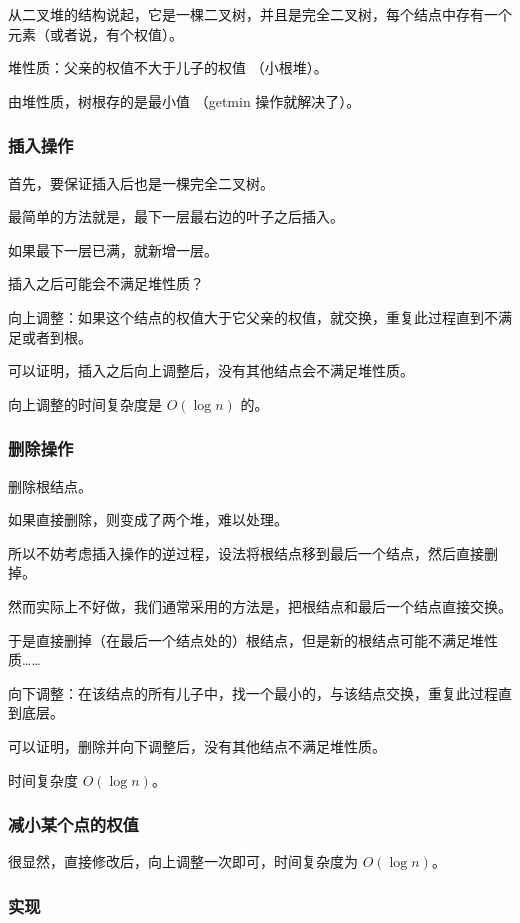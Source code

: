 从二叉堆的结构说起，它是一棵二叉树，并且是完全二叉树，每个结点中存有一个元素（或者说，有个权值）。

堆性质：父亲的权值不大于儿子的权值 （小根堆）。

由堆性质，树根存的是最小值 （getmin 操作就解决了）。

\subsubsection{插入操作}

首先，要保证插入后也是一棵完全二叉树。

最简单的方法就是，最下一层最右边的叶子之后插入。

如果最下一层已满，就新增一层。

插入之后可能会不满足堆性质？

向上调整：如果这个结点的权值大于它父亲的权值，就交换，重复此过程直到不满足或者到根。

可以证明，插入之后向上调整后，没有其他结点会不满足堆性质。

向上调整的时间复杂度是 $O(\log n)$ 的。

\subsubsection{删除操作}

删除根结点。

如果直接删除，则变成了两个堆，难以处理。

所以不妨考虑插入操作的逆过程，设法将根结点移到最后一个结点，然后直接删掉。

然而实际上不好做，我们通常采用的方法是，把根结点和最后一个结点直接交换。

于是直接删掉（在最后一个结点处的）根结点，但是新的根结点可能不满足堆性质……

向下调整：在该结点的所有儿子中，找一个最小的，与该结点交换，重复此过程直到底层。

可以证明，删除并向下调整后，没有其他结点不满足堆性质。

时间复杂度 $O(\log n)$。

\subsubsection{减小某个点的权值}

很显然，直接修改后，向上调整一次即可，时间复杂度为 $O(\log n)$。

\subsubsection{实现}

